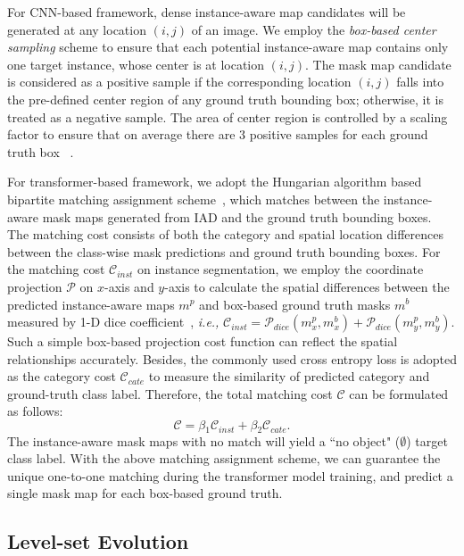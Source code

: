 \documentclass[12pt,onecolumn,letterpaper]{article}
\begin{document}
For CNN-based framework, dense instance-aware map candidates will be generated at any location $(i,j)$ of an image. We employ the \textit{box-based center sampling} scheme to ensure that each potential instance-aware map contains only one target instance, whose center is at location $(i,j)$. The mask map candidate is considered as a positive sample if the corresponding location $(i,j)$ falls into the pre-defined center region of any ground truth bounding box; otherwise, it is treated as a negative sample. The area of center region is controlled by a scaling factor to ensure that on average there are 3 positive samples for each ground truth box ~\cite{wang2020solov2}.

For transformer-based framework, we adopt the Hungarian algorithm based bipartite matching assignment scheme~\cite{eccv2020-detr}, which matches between the instance-aware mask maps generated from IAD and the ground truth bounding boxes. 
The matching cost consists of both the category and spatial location differences between the class-wise mask predictions and ground truth bounding boxes.
For the matching cost $\mathcal{C}_{inst}$ on instance segmentation, we employ the coordinate projection $\mathcal{P}$ on $x$-axis and $y$-axis to calculate the spatial differences between the predicted instance-aware maps $m^p$  and box-based ground truth masks $m^b$ measured by 1-D dice coefficient~\cite{ic3dv2016_dice_loss}, \textit{i.e.,} $\mathcal{C}_{inst} =\mathcal{P}_{{dice}}({m^p_x}, m^b_x) +\mathcal{P}_{{dice}}({m^p_y}, m^b_y)$. 
Such a simple box-based projection cost function can reflect the spatial relationships accurately.
Besides, the commonly used cross entropy loss is adopted as the category cost ${\mathcal{C}_{cate}}$  to measure the similarity of predicted category and ground-truth class label. Therefore, the total matching cost $\mathcal{C}$ can be formulated as follows: 
\begin{equation}\label{mathing_cost_eq}
	\mathcal{C} = \beta  {}_1 \mathcal{C}_{inst} + \beta {}_2 \mathcal{C}_{cate}.
\end{equation}
The instance-aware mask maps with no match will yield a ``no object" ($\emptyset$) target class label. With the above matching assignment scheme, we can guarantee the unique one-to-one matching during the transformer model training, and predict a single mask map for each box-based ground truth.


\subsection{Level-set Evolution} 
\label{section3.3}
\end{document}
